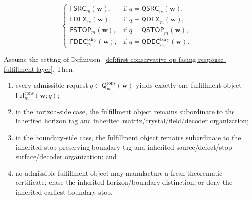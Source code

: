 \begin{definition}
\begin{enumerate}[label=(\roman*)]
\[\begin{cases}
      \mathsf{FSRC}_{m}(\mathbf w), & \text{if }q=\mathsf{QSRC}_{m}(\mathbf w),\\[2mm]
      \mathsf{FDFX}_{m}(\mathbf w), & \text{if }q=\mathsf{QDFX}_{m}(\mathbf w),\\[2mm]
      \mathsf{FSTOP}_{m}(\mathbf w), & \text{if }q=\mathsf{QSTOP}_{m}(\mathbf w),\\[2mm]
      \mathsf{FDEC}^{\mathrm{bdry}}_{m}(\mathbf w), & \text{if }q=\mathsf{QDEC}^{\mathrm{bdry}}_{m}(\mathbf w).
    \end{cases}
  \]
\end{enumerate}
\end{definition}

\begin{proposition}
\label{prop:every-admissible-conservative-op-facing-request-yields-exactly-one-route-faithful-conservative-fulfillment-object}
Assume the setting of Definition~\ref{def:first-conservative-op-facing-response-fulfillment-layer}. Then:
\begin{enumerate}[label=(\roman*)]
  \item every admissible request \(q\in\mathsf{Q}^{\mathrm{cons}}_{m}(\mathbf w)\) yields exactly one fulfillment object \(\mathsf{Ful}^{\mathrm{cons}}_{m}(\mathbf w;q)\);
  \item in the horizon-side case, the fulfillment object remains subordinate to the inherited horizon tag and inherited matrix/crystal/field/decoder organization;
  \item in the boundary-side case, the fulfillment object remains subordinate to the inherited stop-preserving boundary tag and inherited source/defect/stop-surface/decoder organization; and
  \item no admissible fulfillment object may manufacture a fresh theorematic certificate, erase the inherited horizon/boundary distinction, or deny the inherited earliest-boundary stop.
\end{enumerate}
\end{proposition}

